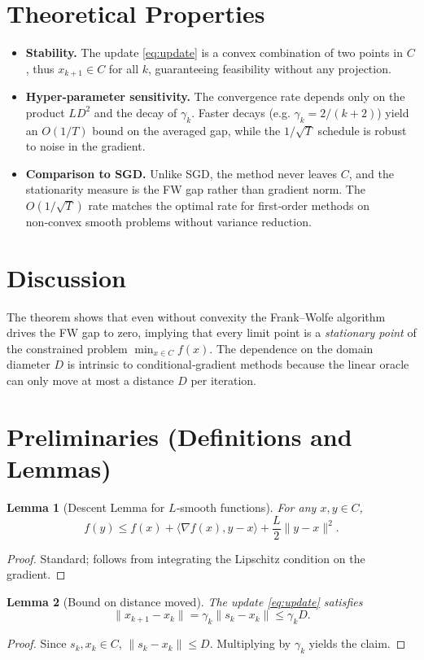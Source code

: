 \documentclass{article}
\newtheorem{lemma}{Lemma}
\begin{document}
\section*{Theoretical Properties}
\begin{itemize}
\item \textbf{Stability.} The update \eqref{eq:update} is a convex combination of two points in $C$, thus $x_{k+1}\in C$ for all $k$, guaranteeing feasibility without any projection.
\item \textbf{Hyper‑parameter sensitivity.} The convergence rate depends only on the product $L D^2$ and the decay of $\gamma_k$. Faster decays (e.g. $\gamma_k=2/(k+2)$) yield an $O(1/T)$ bound on the averaged gap, while the $1/\sqrt{T}$ schedule is robust to noise in the gradient.
\item \textbf{Comparison to SGD.} Unlike SGD, the method never leaves $C$, and the stationarity measure is the FW gap rather than gradient norm. The $O(1/\sqrt{T})$ rate matches the optimal rate for first‑order methods on non‑convex smooth problems without variance reduction.
\end{itemize}

\section*{Discussion}
The theorem shows that even without convexity the Frank–Wolfe algorithm drives the FW gap to zero, implying that every limit point is a \emph{stationary point} of the constrained problem $\min_{x\in C}f(x)$. The dependence on the domain diameter $D$ is intrinsic to conditional‑gradient methods because the linear oracle can only move at most a distance $D$ per iteration.

\section*{Preliminaries (Definitions and Lemmas)}
\begin{lemma}[Descent Lemma for $L$‑smooth functions]\label{lem:descent}
For any $x,y\in C$,
\[
f(y) \le f(x) + \langle \nabla f(x),y-x\rangle + \frac{L}{2}\|y-x\|^2 .
\]
\end{lemma}
\begin{proof}
Standard; follows from integrating the Lipschitz condition on the gradient. \qedhere
\end{proof}

\begin{lemma}[Bound on distance moved]\label{lem:stepbound}
The update \eqref{eq:update} satisfies
\[
\|x_{k+1}-x_k\| = \gamma_k\|s_k-x_k\|\le \gamma_k D .
\]
\end{lemma}
\begin{proof}
Since $s_k,x_k\in C$, $\|s_k-x_k\|\le D$. Multiplying by $\gamma_k$ yields the claim. \qedhere
\end{proof}
\end{document}
